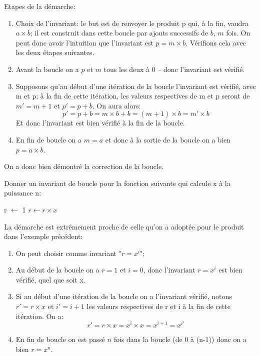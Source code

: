 \documentclass[12pt]{article}
\begin{document}
	Etapes de la démarche:
	\begin{enumerate}
		\item Choix de l'invariant: le but est de renvoyer le produit p qui, à la fin, vaudra $a \times b$; il est construit dans cette boucle par ajouts successifs de $b$, $m$ fois. On peut donc avoir l'intuition que l'invariant est $p = m \times b$. Vérifions cela avec les deux étapes suivantes.
		\item Avant la boucle on a $p$ et $m$ tous les deux à 0 -- donc l'invariant est vérifié.
		\item Supposons qu'au début d'une itération de la boucle l'invariant est vérifié, avec m et p; à la fin de cette itération, les valeurs respectives de m et p seront de $m' = m + 1$ et $p' = p + b$.  On aura alors:
		\[ p' = p + b = m \times b + b = (m + 1) \times b = m' \times b\]
		Et donc l'invariant est bien vérifié à la fin de la boucle.
		\item En fin de boucle on a $m = a$ et donc à la sortie de la boucle on a bien $p = a \times b$.
	\end{enumerate}
	
	On a donc bien démontré la correction de la boucle.
	
	\begin{MonExo}
		Donner un invariant de boucle pour la fonction suivante qui calcule x à la puissance n:
		\begin{algorithmic}[1]
			\State r $\leftarrow$ 1
			\State $r \leftarrow r \times x$
			\EndFor
			\State{}
			\EndFunction
		\end{algorithmic}
	\end{MonExo}
	
	\begin{MaReponse}
		La démarche est extrêmement proche de celle qu'on a adoptée pour le produit dans l'exemple précédent:
		\begin{enumerate}
			\item On peut choisir comme invariant "$r = x^i$";
			\item Au début de la boucle on a $r = 1$ et $i = 0$, donc l'invariant $r = x^i$ est bien vérifié, quel que soit x.
			\item Si au début d'une itération de la boucle on a l'invariant vérifié, notons $r' = r \times x$ et $i' = i + 1$ les valeurs respectives de r et i à la fin de cette itération. On a:
			\[ r' = r \times x = x^i \times x = x^{i+1} = x^{i'}\]
			\item En fin de boucle on est passé $n$ fois dans la boucle (de 0 à (n-1)) donc on a bien $r = x^n$.
		\end{enumerate}
	\end{MaReponse}
\end{document}
